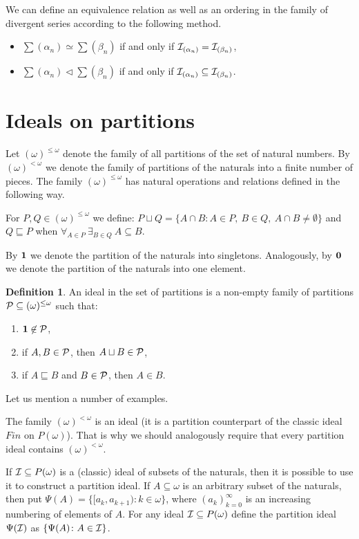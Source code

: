 \documentclass[12pt]{article}
\theoremstyle{plain}
\theoremstyle{definition}
\newtheorem{definition}[theorem]{Definition}
\theoremstyle{remark}
\newcommand{\cI}{{\cal I}}
\newcommand{\cP}{{\cal P}}
\newcommand{\Part}{(\omega)^{\leq\omega}}
\newcommand{\FinPart}{(\omega)^{<\omega}}
\begin{document}
We can define an equivalence relation as well as an ordering in the family of divergent series according to the following method.
\begin{itemize}
	\item $\sum {(\alpha_n)} \simeq \sum {(\beta_n)}$ if and only if $\cI_{(\alpha_n)} = \cI_{(\beta_n)}$,
	\item $\sum {(\alpha_n)} \lhd \sum {(\beta_n)}$ if and only if
$\cI_{(\alpha_n)} \subseteq \cI_{(\beta_n)}$.
\end{itemize}




\section{Ideals on partitions}

Let $\Part$ denote the family of all partitions of the set of natural numbers. By $\FinPart$ we denote the family of partitions of the naturals into a finite number of pieces. The family $\Part$ has natural operations and relations defined in the following way.

For $P,Q \in \Part$ we define:
$P\sqcup Q = \{A \cap B \colon A \in P,\ B\in Q,\ A \cap B \not= \emptyset\}$
and $Q \sqsubseteq P$ when $\forall_{A\in P}\ \exists_{B\in Q}\ A\subseteq B$.

By ${\bf 1}$ we denote the partition of the naturals into singletons. Analogously, by ${\bf 0}$ we denote the partition of the naturals into one element.

\begin{definition}
An ideal in the set of partitions is a non-empty family of partitions $\cP \subseteq \Part$ such that:
\begin{enumerate}
\item ${\bf 1} \not\in\cP$,
\item if $A,B\in \cP$, then $A\sqcup B\in \cP$,
\item if $A \sqsubseteq B$ and $B\in \cP$, then $A\in B$.
\end{enumerate}
\end{definition}
 
Let us mention a number of examples.

The family $\FinPart$ is an ideal (it is a partition counterpart of the classic ideal $Fin$ on $P(\omega)$).
That is why we should analogously require that every partition ideal contains $\FinPart$.

If $\cI\subseteq P(\omega)$ is a (classic) ideal of subsets of the naturals, then it is possible to use it to construct a partition ideal. If $A\subseteq\omega$ is an arbitrary subset of the naturals, then put $\Psi(A) = 
\{[a_k, a_{k+1}) \colon k\in\omega\}$, where
$(a_k)_{k=0}^{\infty}$ is an increasing numbering of elements of $A$. For any ideal $\cI \subseteq P(\omega)$ define the partition ideal $\Psi(\cI)$ as $\{\Psi(A)\colon A\in\cI\}$.
\end{document}
